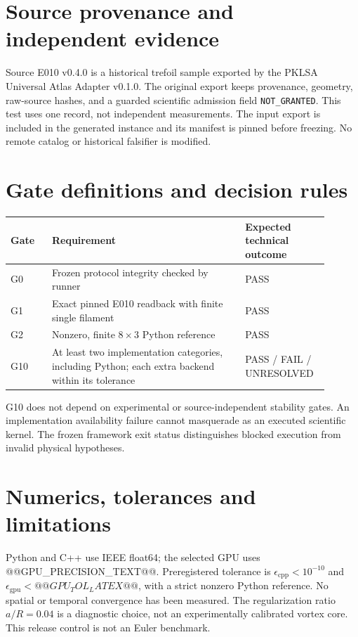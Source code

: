 \documentclass[11pt,a4paper]{article}
\begin{document}
\section{Source provenance and independent evidence}
Source E010 v0.4.0 is a historical trefoil sample exported by the PKLSA Universal Atlas Adapter v0.1.0. The original export keeps provenance, geometry, raw-source hashes, and a guarded scientific admission field \texttt{NOT\_GRANTED}. This test uses one record, not independent measurements. The input export is included in the generated instance and its manifest is pinned before freezing. No remote catalog or historical falsifier is modified.
\section{Gate definitions and decision rules}
\begin{longtable}{p{0.12\linewidth}p{0.57\linewidth}p{0.21\linewidth}}\toprule
Gate & Requirement & Expected technical outcome \\ \midrule
G0 & Frozen protocol integrity checked by runner & PASS \\
G1 & Exact pinned E010 readback with finite single filament & PASS \\
G2 & Nonzero, finite $8\times3$ Python reference & PASS \\
G10 & At least two implementation categories, including Python; each extra backend within its tolerance & PASS / FAIL / UNRESOLVED \\ \bottomrule\end{longtable}
G10 does not depend on experimental or source-independent stability gates. An implementation availability failure cannot masquerade as an executed scientific kernel. The frozen framework exit status distinguishes blocked execution from invalid physical hypotheses.
\section{Numerics, tolerances and limitations}
Python and C++ use IEEE float64; the selected GPU uses @@GPU_PRECISION_TEXT@@. Preregistered tolerance is $\epsilon_{\mathrm{cpp}}<10^{-10}$ and $\epsilon_{\mathrm{gpu}}<@@GPU_TOL_LATEX@@$, with a strict nonzero Python reference. No spatial or temporal convergence has been measured. The regularization ratio $a/R=0.04$ is a diagnostic choice, not an experimentally calibrated vortex core. This release control is not an Euler benchmark.
\end{document}
